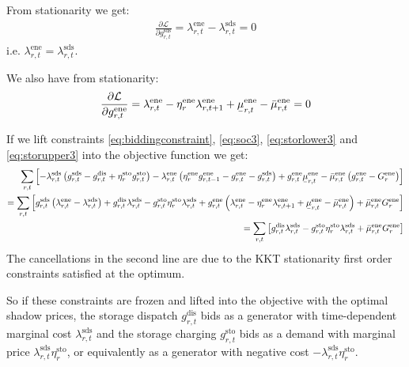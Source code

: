 \documentclass[final,3p,times]{elsarticle}
\newcommand{\ubar}[1]{\text{\b{$#1$}}}
\def\d{\partial}
\def\cL{\mathcal{L}}
\begin{document}
From stationarity we get:
\begin{align}
\frac{\d \cL}{\d g^{\textrm{sds}}_{r,t}} = \lambda^{\textrm{ene}}_{r,t} - \lambda^{\textrm{sds}}_{r,t} = 0
\end{align}
i.e. $\lambda^{\textrm{ene}}_{r,t} = \lambda^{\textrm{sds}}_{r,t}$.

We also have from stationarity:
\begin{align}
\frac{\d \cL}{\d g^{\textrm{ene}}_{r,t}} = \lambda^{\textrm{ene}}_{r,t} - \eta^{\textrm{ene}}_r\lambda^{\textrm{ene}}_{r,t+1} + \ubar{\mu}^{\textrm{ene}}_{r,t} -  \bar{\mu}^{\textrm{ene}}_{r,t} = 0
\end{align}


If we lift constraints \eqref{eq:biddingconstraint}, \eqref{eq:soc3}, \eqref{eq:storlower3} and \eqref{eq:storupper3} into the objective function we get:
\begin{align}
  \sum_{r,t} \left[ - \lambda^{\textrm{sds}}_{r,t} \left(  g^{\textrm{sds}}_{r,t} - g^{\textrm{dis}}_{r,t} + \eta^{\textrm{sto}}_r g^{\textrm{sto}}_{r,t}\right) - \lambda^{\textrm{ene}}_{r,t} \left(\eta^{\textrm{ene}}_r g^{\textrm{ene}}_{r,t-1} - g^{\textrm{ene}}_{r,t} - g^{\textrm{sds}}_{r,t}\right)  + g^{\textrm{ene}}_{r,t}\ubar{\mu}^{\textrm{ene}}_{r,t} -  \bar{\mu}^{\textrm{ene}}_{r,t}  \left(    g^{\textrm{ene}}_{r,t} - G^{\textrm{ene}}_r \right) \right] \\
  =   \sum_{r,t} \left[  g^{\textrm{sds}}_{r,t} \left(\lambda^{\textrm{ene}}_{r,t} - \lambda^{\textrm{sds}}_{r,t} \right)  +g^{\textrm{dis}}_{r,t}\lambda^{\textrm{sds}}_{r,t}  -  g^{\textrm{sto}}_{r,t} \eta^{\textrm{sto}}_r \lambda^{\textrm{sds}}_{r,t} + g^{\textrm{ene}}_{r,t}\left(\lambda^{\textrm{ene}}_{r,t} -\eta^{\textrm{ene}}_r \lambda^{\textrm{ene}}_{r,t+1}  + \ubar{\mu}^{\textrm{ene}}_{r,t} -  \bar{\mu}^{\textrm{ene}}_{r,t} \right) + \bar{\mu}^{\textrm{ene}}_{r,t} G^{\textrm{ene}}_r \right] \\
   =   \sum_{r,t} \left[ g^{\textrm{dis}}_{r,t}\lambda^{\textrm{sds}}_{r,t}  -  g^{\textrm{sto}}_{r,t} \eta^{\textrm{sto}}_r \lambda^{\textrm{sds}}_{r,t} + \bar{\mu}^{\textrm{ene}}_{r,t} G^{\textrm{ene}}_r \right]
\end{align}
The cancellations in the second line are due to the KKT stationarity first order constraints satisfied at the optimum.

So if these constraints are frozen and lifted into the objective with the optimal shadow prices, the storage dispatch $g^{\textrm{dis}}_{r,t}$ bids as a generator with time-dependent marginal cost $\lambda^{\textrm{sds}}_{r,t} $ and the storage charging $g^{\textrm{sto}}_{r,t}$ bids as a demand with marginal price $\lambda^{\textrm{sds}}_{r,t} \eta^{\textrm{sto}}_r$, or equivalently as a generator with negative cost $-\lambda^{\textrm{sds}}_{r,t} \eta^{\textrm{sto}}_r$.
\end{document}
